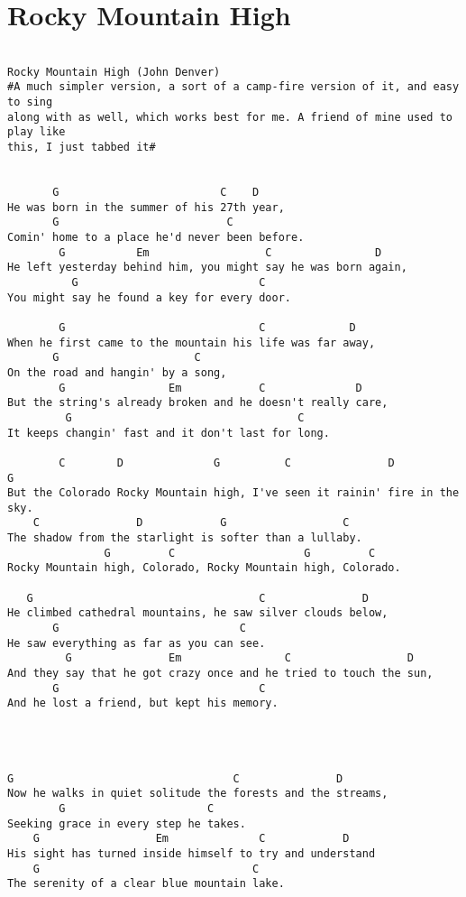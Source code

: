 \documentclass[leqno]{memoir}
\begin{document}
\chapter{Rocky Mountain High}
\begin{verbatim}

Rocky Mountain High (John Denver)
#A much simpler version, a sort of a camp-fire version of it, and easy to sing 
along with as well, which works best for me. A friend of mine used to play like 
this, I just tabbed it#


       G                         C    D
He was born in the summer of his 27th year,
       G                          C
Comin' home to a place he'd never been before.
        G           Em                  C                D
He left yesterday behind him, you might say he was born again,
          G                            C
You might say he found a key for every door.

        G                              C             D
When he first came to the mountain his life was far away,
       G                     C
On the road and hangin' by a song,
        G                Em            C              D
But the string's already broken and he doesn't really care,
         G                                   C
It keeps changin' fast and it don't last for long.

        C        D              G          C               D           G
But the Colorado Rocky Mountain high, I've seen it rainin' fire in the sky.
    C               D            G                  C
The shadow from the starlight is softer than a lullaby.
               G         C                    G         C
Rocky Mountain high, Colorado, Rocky Mountain high, Colorado.

   G                                   C               D
He climbed cathedral mountains, he saw silver clouds below,
       G                            C
He saw everything as far as you can see.
         G               Em                C                  D
And they say that he got crazy once and he tried to touch the sun,
       G                               C
And he lost a friend, but kept his memory.




G                                  C               D
Now he walks in quiet solitude the forests and the streams,
        G                      C
Seeking grace in every step he takes.
    G                  Em              C            D
His sight has turned inside himself to try and understand
    G                                 C
The serenity of a clear blue mountain lake.


\end{verbatim}
\end{document}
